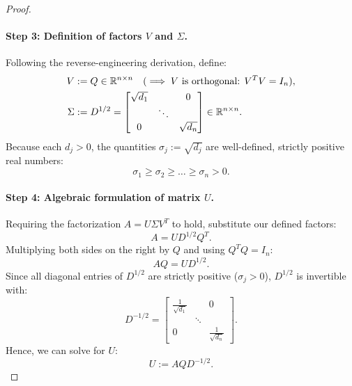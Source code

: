 \begin{proof}
\paragraph{Step 3: Definition of factors $V$ and $\Sigma$.}
Following the reverse-engineering derivation, define:
\begin{align}
    V &:= Q \in \mathbb{R}^{n \times n} \quad (\implies V \text{ is orthogonal: } V^T V = I_n), \\
    \Sigma &:= D^{1/2} = \begin{bmatrix}
        \sqrt{d_1} & & 0 \\
        & \ddots & \\
        0 & & \sqrt{d_n}
    \end{bmatrix} \in \mathbb{R}^{n \times n}.
\end{align}
Because each $d_j > 0$, the quantities $\sigma_j := \sqrt{d_j}$ are well-defined, strictly positive real numbers:
\begin{equation}
    \sigma_1 \ge \sigma_2 \ge \dots \ge \sigma_n > 0.
\end{equation}

\paragraph{Step 4: Algebraic formulation of matrix $U$.}
Requiring the factorization $A = U \Sigma V^T$ to hold, substitute our defined factors:
\begin{equation}
    A = U D^{1/2} Q^T.
\end{equation}
Multiplying both sides on the right by $Q$ and using $Q^T Q = I_n$:
\begin{equation}
    A Q = U D^{1/2}.
\end{equation}
Since all diagonal entries of $D^{1/2}$ are strictly positive ($\sigma_j > 0$), $D^{1/2}$ is invertible with:
\begin{equation}
    D^{-1/2} = \begin{bmatrix}
        \frac{1}{\sqrt{d_1}} & & 0 \\
        & \ddots & \\
        0 & & \frac{1}{\sqrt{d_n}}
    \end{bmatrix}.
\end{equation}
Hence, we can solve for $U$:
\begin{equation}
\label{eq:svd-construct-U-en}
    U := A Q D^{-1/2}.
\end{equation}


\end{proof}
